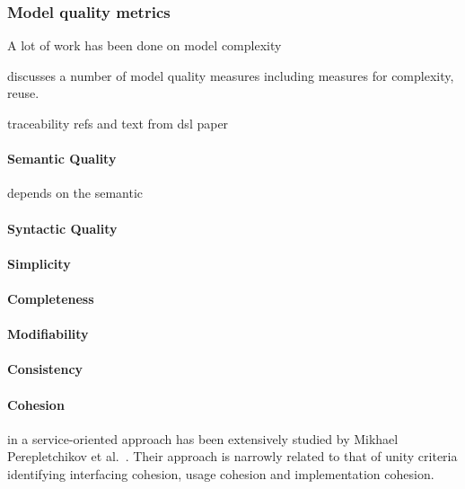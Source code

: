 
\subsubsection{Model quality metrics}

A lot of work has been done on model complexity

\cite{mohagheghi_existing_2009} discusses a number of model quality measures including measures for complexity, reuse.

traceability refs and text from dsl paper

\paragraph{Semantic Quality} depends on the semantic 

\paragraph{Syntactic Quality}

\paragraph{Simplicity}

\paragraph{Completeness}

\paragraph{Modifiability}

\paragraph{Consistency}

\paragraph{Cohesion} in a service-oriented approach has been extensively studied by Mikhael Perepletchikov et al.\ \cite{perepletchikov_cohesion_2007,perepletchikov_impact_2010}. Their approach is narrowly related to that of unity criteria \cite{gonzalez_unity_2009} identifying interfacing cohesion, usage cohesion and implementation cohesion. 

